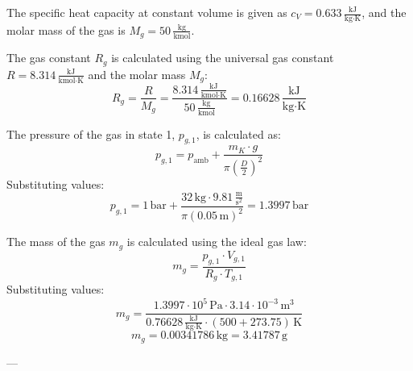 The specific heat capacity at constant volume is given as \( c_V = 0.633 \, \frac{\text{kJ}}{\text{kg·K}} \), and the molar mass of the gas is \( M_g = 50 \, \frac{\text{kg}}{\text{kmol}} \).  

The gas constant \( R_g \) is calculated using the universal gas constant \( R = 8.314 \, \frac{\text{kJ}}{\text{kmol·K}} \) and the molar mass \( M_g \):  
\[
R_g = \frac{R}{M_g} = \frac{8.314 \, \frac{\text{kJ}}{\text{kmol·K}}}{50 \, \frac{\text{kg}}{\text{kmol}}} = 0.16628 \, \frac{\text{kJ}}{\text{kg·K}}
\]  

The pressure of the gas in state 1, \( p_{g,1} \), is calculated as:  
\[
p_{g,1} = p_{\text{amb}} + \frac{m_K \cdot g}{\pi \left( \frac{D}{2} \right)^2}
\]  
Substituting values:  
\[
p_{g,1} = 1 \, \text{bar} + \frac{32 \, \text{kg} \cdot 9.81 \, \frac{\text{m}}{\text{s}^2}}{\pi \left( 0.05 \, \text{m} \right)^2} = 1.3997 \, \text{bar}
\]  

The mass of the gas \( m_g \) is calculated using the ideal gas law:  
\[
m_g = \frac{p_{g,1} \cdot V_{g,1}}{R_g \cdot T_{g,1}}
\]  
Substituting values:  
\[
m_g = \frac{1.3997 \cdot 10^5 \, \text{Pa} \cdot 3.14 \cdot 10^{-3} \, \text{m}^3}{0.76628 \, \frac{\text{kJ}}{\text{kg·K}} \cdot (500 + 273.75) \, \text{K}}
\]  
\[
m_g = 0.00341786 \, \text{kg} = 3.41787 \, \text{g}
\]  

---